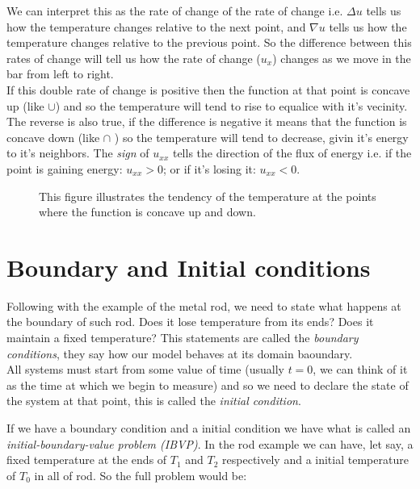 \documentclass[../pde.tex]{subfiles}
\begin{document}
    We can interpret this as the rate of change of the rate of change i.e. $\Delta u$ tells us how the temperature changes
    relative to the next point, and $\nabla u$ tells us how the temperature changes relative to the previous point. So the
    difference between this rates of change will tell us how the rate of change ($u_x$) changes as we move in the bar from left to
    right.\\
    If this double rate of change is positive then the function at that point is concave up 
    (like $\cup$) and so the temperature will tend to rise to equalice with it's vecinity. The reverse is also true, if the
    difference is negative it means that the function is concave down (like $\cap$ ) so the temperature will tend to decrease,
    givin it's energy to it's neighbors. The \emph{sign} of $u_{xx}$ tells the direction of the flux of energy i.e. if the point
    is gaining energy: $u_{xx}>0$; or if it's losing it: $u_{xx}<0$.

    \begin{figure}[ht]
        \centering
        \caption{This figure illustrates the tendency of the temperature at the points where the function is concave up and down.}
        \label{fig:uxx}
    \end{figure}

    \section{\sffamily Boundary and Initial conditions}
    
    Following with the example of the metal rod, we need to state what happens at the boundary of such rod. Does it lose
    temperature from its ends? Does it maintain a fixed temperature? This statements are called the \emph{boundary conditions},
    they say how our model behaves at its domain baoundary.\\
    All systems must start from some value of time (usually $t=0$, we can think of it as the time at which we begin to measure)
    and so we need to declare the state of the system at that point, this is called the \emph{initial condition}.

    If we have a boundary condition and a initial condition we have what is called an \emph{initial-boundary-value problem
    (IBVP)}.
    In the rod example we can have, let say, a fixed temperature at the ends of $T_1$ and $T_2$ respectively and a initial
    temperature of $T_0$ in all of rod. So the full problem would be:
    
\end{document}

